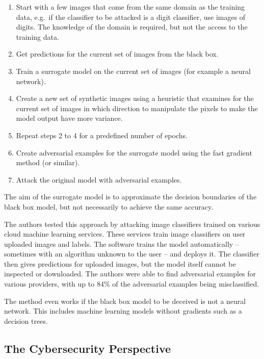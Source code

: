 \documentclass[
  12pt,
]{krantz}
\providecommand{\tightlist}{%
  \setlength{\itemsep}{0pt}\setlength{\parskip}{0pt}}
\begin{document}
\begin{enumerate}
\def\labelenumi{\arabic{enumi}.}
\tightlist
\item
  Start with a few images that come from the same domain as the training data, e.g.~if the classifier to be attacked is a digit classifier, use images of digits. The knowledge of the domain is required, but not the access to the training data.
\item
  Get predictions for the current set of images from the black box.
\item
  Train a surrogate model on the current set of images (for example a neural network).
\item
  Create a new set of synthetic images using a heuristic that examines for the current set of images in which direction to manipulate the pixels to make the model output have more variance.
\item
  Repeat steps 2 to 4 for a predefined number of epochs.
\item
  Create adversarial examples for the surrogate model using the fast gradient method (or similar).
\item
  Attack the original model with adversarial examples.
\end{enumerate}

The aim of the surrogate model is to approximate the decision boundaries of the black box model, but not necessarily to achieve the same accuracy.

The authors tested this approach by attacking image classifiers trained on various cloud machine learning services.
These services train image classifiers on user uploaded images and labels.
The software trains the model automatically -- sometimes with an algorithm unknown to the user -- and deploys it.
The classifier then gives predictions for uploaded images, but the model itself cannot be inspected or downloaded.
The authors were able to find adversarial examples for various providers, with up to 84\% of the adversarial examples being misclassified.

The method even works if the black box model to be deceived is not a neural network.
This includes machine learning models without gradients such as a decision trees.

\hypertarget{the-cybersecurity-perspective}{%
\subsection{The Cybersecurity Perspective}\label{the-cybersecurity-perspective}}
\end{document}
